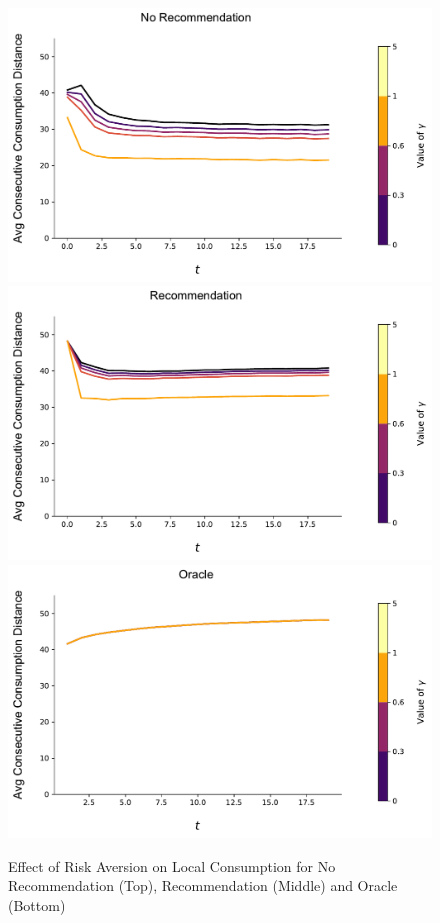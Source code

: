\documentclass[sigconf]{acmart}
\begin{document}
\begin{figure}[t]
\includegraphics[width=\linewidth]{figures/gamma_consumption_dist_N_200T_20.pdf}\\
\includegraphics[width=\linewidth]{figures/gamma_consumption_dist_N_200T_20_partial.pdf}\\
\includegraphics[width=\linewidth]{figures/gamma_consumption_dist_N_200T_20_omni.pdf}\\
\caption{Effect of Risk Aversion on Local Consumption for No Recommendation (Top), Recommendation (Middle) and Oracle (Bottom)}
\label{fig:no_rec_risk_aversion}
\end{figure}
\end{document}
